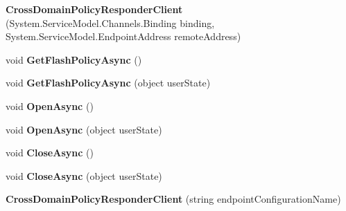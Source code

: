 \begin{DoxyCompactItemize}
\item 
\hypertarget{class_cross_domain_policy_responder_client_a8597cad92f66c9a1621fbb1d77f488fa}{
{\bfseries CrossDomainPolicyResponderClient} (System.ServiceModel.Channels.Binding binding, System.ServiceModel.EndpointAddress remoteAddress)}
\label{class_cross_domain_policy_responder_client_a8597cad92f66c9a1621fbb1d77f488fa}

\item 
\hypertarget{class_cross_domain_policy_responder_client_a50b916f19939c792d8720c460117b746}{
void {\bfseries GetFlashPolicyAsync} ()}
\label{class_cross_domain_policy_responder_client_a50b916f19939c792d8720c460117b746}

\item 
\hypertarget{class_cross_domain_policy_responder_client_a4c07ab986ee8a200d441434c1fb81cfa}{
void {\bfseries GetFlashPolicyAsync} (object userState)}
\label{class_cross_domain_policy_responder_client_a4c07ab986ee8a200d441434c1fb81cfa}

\item 
\hypertarget{class_cross_domain_policy_responder_client_a9e5c1d1298125952ed3b99aa402c5af5}{
void {\bfseries OpenAsync} ()}
\label{class_cross_domain_policy_responder_client_a9e5c1d1298125952ed3b99aa402c5af5}

\item 
\hypertarget{class_cross_domain_policy_responder_client_ae89e8766c64ccc9a78707686f65c4af5}{
void {\bfseries OpenAsync} (object userState)}
\label{class_cross_domain_policy_responder_client_ae89e8766c64ccc9a78707686f65c4af5}

\item 
\hypertarget{class_cross_domain_policy_responder_client_ab15a4cca0d395c15bd0f2c29b620a4db}{
void {\bfseries CloseAsync} ()}
\label{class_cross_domain_policy_responder_client_ab15a4cca0d395c15bd0f2c29b620a4db}

\item 
\hypertarget{class_cross_domain_policy_responder_client_a0198562d78b04ec1f5590dd27a3e4943}{
void {\bfseries CloseAsync} (object userState)}
\label{class_cross_domain_policy_responder_client_a0198562d78b04ec1f5590dd27a3e4943}

\item 
\hypertarget{class_cross_domain_policy_responder_client_a5bb8ef77ac406eea2c2ebfa219dc4c90}{
{\bfseries CrossDomainPolicyResponderClient} (string endpointConfigurationName)}
\label{class_cross_domain_policy_responder_client_a5bb8ef77ac406eea2c2ebfa219dc4c90}


\end{DoxyCompactItemize}
